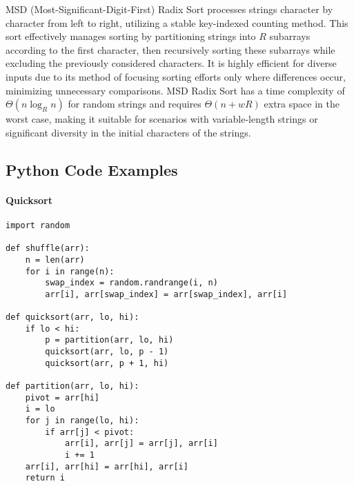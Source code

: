 \documentclass{article}
\begin{document}
MSD (Most-Significant-Digit-First) Radix Sort processes strings character by character from left to right, utilizing a stable key-indexed counting method. This sort effectively manages sorting by partitioning strings into $R$ subarrays according to the first character, then recursively sorting these subarrays while excluding the previously considered characters. It is highly efficient for diverse inputs due to its method of focusing sorting efforts only where differences occur, minimizing unnecessary comparisons. MSD Radix Sort has a time complexity of $\Theta(n \log_R n)$ for random strings and requires $\Theta(n+wR)$ extra space in the worst case, making it suitable for scenarios with variable-length strings or significant diversity in the initial characters of the strings.

\subsection{Python Code Examples}

\paragraph{Quicksort}
\begin{verbatim}
import random

def shuffle(arr):
    n = len(arr)
    for i in range(n):
        swap_index = random.randrange(i, n)
        arr[i], arr[swap_index] = arr[swap_index], arr[i]

def quicksort(arr, lo, hi):
    if lo < hi:
        p = partition(arr, lo, hi)
        quicksort(arr, lo, p - 1)
        quicksort(arr, p + 1, hi)

def partition(arr, lo, hi):
    pivot = arr[hi]
    i = lo
    for j in range(lo, hi):
        if arr[j] < pivot:
            arr[i], arr[j] = arr[j], arr[i]
            i += 1
    arr[i], arr[hi] = arr[hi], arr[i]
    return i
\end{verbatim}
\end{document}
